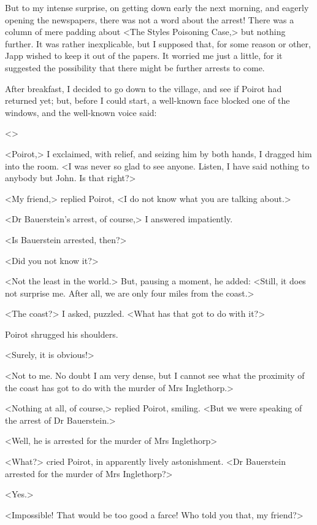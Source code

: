  But to my intense surprise, on getting down early the next morning, and eagerly opening the newspapers, there was not a word about the arrest! There was a column of mere padding about <The Styles Poisoning Case,> but nothing further. It was rather inexplicable, but I supposed that, for some reason or other, Japp wished to keep it out of the papers. It worried me just a little, for it suggested the possibility that there might be further arrests to come. 

 After breakfast, I decided to go down to the village, and see if Poirot had returned yet; but, before I could start, a well-known face blocked one of the windows, and the well-known voice said: 

 <> 

 <Poirot,> I exclaimed, with relief, and seizing him by both hands, I dragged him into the room. <I was never so glad to see anyone. Listen, I have said nothing to anybody but John. Is that right?> 

 <My friend,> replied Poirot, <I do not know what you are talking about.> 

 <Dr Bauerstein's arrest, of course,> I answered impatiently. 

 <Is Bauerstein arrested, then?> 

 <Did you not know it?> 

 <Not the least in the world.> But, pausing a moment, he added: <Still, it does not surprise me. After all, we are only four miles from the coast.> 

 <The coast?> I asked, puzzled. <What has that got to do with it?> 

 Poirot shrugged his shoulders. 

 <Surely, it is obvious!> 

 <Not to me. No doubt I am very dense, but I cannot see what the proximity of the coast has got to do with the murder of Mrs Inglethorp.> 

 <Nothing at all, of course,> replied Poirot, smiling. <But we were speaking of the arrest of Dr Bauerstein.> 

 <Well, he is arrested for the murder of Mrs Inglethorp\longdash> 

 <What?> cried Poirot, in apparently lively astonishment. <Dr Bauerstein arrested for the murder of Mrs Inglethorp?> 

 <Yes.> 

 <Impossible! That would be too good a farce! Who told you that, my friend?> 

